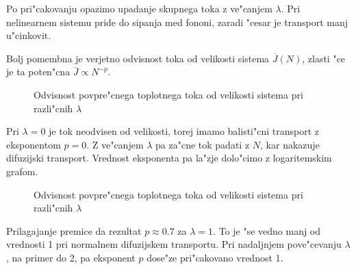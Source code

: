 \documentclass[a4paper,10pt]{article}
\begin{document}
Po pri"cakovanju opazimo upadanje skupnega toka z ve"canjem $\lambda$. 
Pri nelinearnem sistemu pride do sipanja med fononi, zaradi "cesar je transport manj u"cinkovit. 

Bolj pomembna je verjetno odvisnost toka od velikosti sistema $\overline{J}(N)$, zlasti "ce je ta poten"cna $\overline{J} \propto N^{-p}$. 

\begin{figure}[H]
 \centering
 
\caption{Odvisnost povpre"cnega toplotnega toka od velikosti sistema pri razli"cnih $\lambda$}
\end{figure}

Pri $\lambda = 0$ je tok neodvisen od velikosti, torej imamo balisti"cni transport z eksponentom $p=0$. 
Z ve"canjem $\lambda$ pa za"cne tok padati z $N$, kar nakazuje difuzijski transport. 
Vrednost eksponenta pa la"zje dolo"cimo z logaritemskim grafom. 

\begin{figure}[H]
 \centering
 
\caption{Odvisnost povpre"cnega toplotnega toka od velikosti sistema pri razli"cnih $\lambda$}
\end{figure}

Prilagajanje premice da rezultat $p\approx 0.7$ za $\lambda=1$.
To je "se vedno manj od vrednosti 1 pri normalnem difuzijskem transportu. 
Pri nadaljnjem pove"cevanju $\lambda$, na primer do 2, pa eksponent $p$ dose"ze pri"cakovano vrednost 1. 
\end{document}
